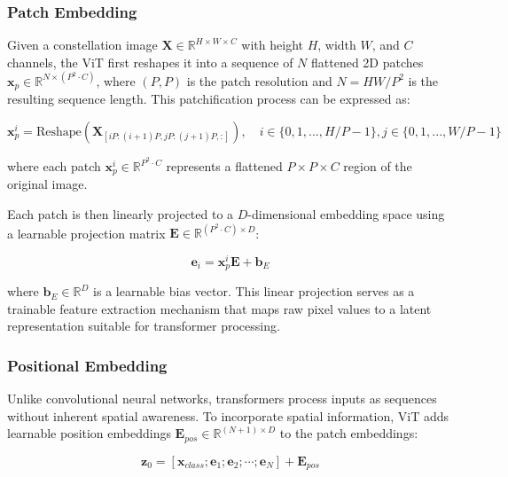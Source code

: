 \subsubsection{Patch Embedding}

Given a constellation image $\mathbf{X} \in \mathbb{R}^{H \times W \times C}$ with height $H$, width $W$, and $C$ channels, the ViT first reshapes it into a sequence of $N$ flattened 2D patches $\mathbf{x}_p \in \mathbb{R}^{N \times (P^2 \cdot C)}$, where $(P, P)$ is the patch resolution and $N = HW/P^2$ is the resulting sequence length. This patchification process can be expressed as:

\begin{equation}
\mathbf{x}_p^i = \text{Reshape}(\mathbf{X}_{[iP:(i+1)P, jP:(j+1)P, :]}), \quad i \in \{0,1,...,H/P-1\}, j \in \{0,1,...,W/P-1\}
\end{equation}

where each patch $\mathbf{x}_p^i \in \mathbb{R}^{P^2 \cdot C}$ represents a flattened $P \times P \times C$ region of the original image.

Each patch is then linearly projected to a $D$-dimensional embedding space using a learnable projection matrix $\mathbf{E} \in \mathbb{R}^{(P^2 \cdot C) \times D}$:

\begin{equation}
\mathbf{e}_i = \mathbf{x}_p^i\mathbf{E} + \mathbf{b}_E
\end{equation}

where $\mathbf{b}_E \in \mathbb{R}^D$ is a learnable bias vector. This linear projection serves as a trainable feature extraction mechanism that maps raw pixel values to a latent representation suitable for transformer processing.

\subsubsection{Positional Embedding}

Unlike convolutional neural networks, transformers process inputs as sequences without inherent spatial awareness. To incorporate spatial information, ViT adds learnable position embeddings $\mathbf{E}_{pos} \in \mathbb{R}^{(N+1) \times D}$ to the patch embeddings:

\begin{equation}
\mathbf{z}_0 = [\mathbf{x}_{class}; \mathbf{e}_1; \mathbf{e}_2; \cdots; \mathbf{e}_N] + \mathbf{E}_{pos}
\end{equation}

